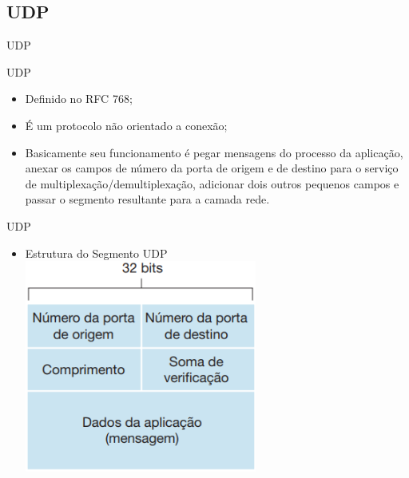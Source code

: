 \documentclass{libs/ufc_format}
\begin{document}
\subsection{UDP}

\begin{frame}{}
    \centering
    \Large
    UDP
\end{frame}

\begin{frame}{UDP}
    \begin{itemize}
        \justifying
        \item Definido no RFC 768;
        \item É um protocolo não orientado a conexão;
        \item Basicamente seu funcionamento é pegar mensagens do processo da aplicação, anexar os campos de número da porta de origem e de destino para o \alert<2>{serviço de multiplexação/demultiplexação}, adicionar dois outros pequenos campos e passar o segmento resultante para a camada rede.
    \end{itemize}
\end{frame}

\begin{frame}{UDP}
    \begin{itemize}
        \item Estrutura do Segmento UDP\\
        \centering
        \includegraphics[width=0.6\textwidth]{figuras/figura06_02}
    \end{itemize}
\end{frame}
\end{document}
